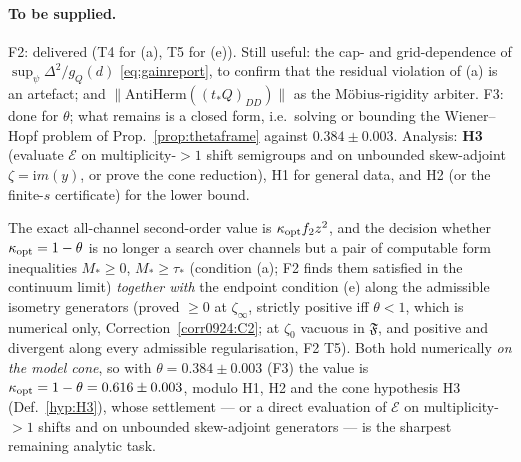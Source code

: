 \documentclass[11pt]{article}
\begin{document}
\paragraph{To be supplied.}
F2: delivered (T4 for (a), T5 for (e)).  Still useful: the cap- and grid-dependence
of $\sup_\psi\Delta^2/g_Q(d)$ \eqref{eq:gainreport}, to confirm that the residual violation
of (a) is an artefact; and $\|\mathrm{AntiHerm}((t_*Q)_{DD})\|$ as the M\"obius-rigidity
arbiter.  F3: done for $\theta$; what remains is a closed form, i.e.\ solving or bounding
the Wiener--Hopf problem of Prop.~\ref{prop:thetaframe} against $0.384\pm0.003$.  Analysis:
\textbf{H3} (evaluate $\mathcal E$ on multiplicity-$>1$ shift semigroups and on unbounded
skew-adjoint $\zeta=\mathrm im(y)$, or prove the cone reduction), H1 for general data, and
H2 (or the finite-$s$ certificate) for the lower bound.

\begin{verdictgap}
The exact all-channel second-order value is $\kappa_{\rm opt}f_2z^2$, and the decision
whether $\kappa_{\rm opt}=1-\theta$ is no longer a search over channels but a pair of
computable form inequalities $M_*\ge0$, $M_*\ge\tau_*$ (condition (a); F2 finds them
satisfied in the continuum limit) \emph{together with} the endpoint condition (e) along the
admissible isometry generators (proved $\ge0$ at $\zeta_\infty$, strictly positive iff $\theta<1$, which is numerical only, Correction~\ref{corr0924:C2}; at $\zeta_0$ vacuous in
$\mathfrak F$, and positive and divergent along every admissible regularisation, F2 T5).
Both hold numerically \emph{on the model cone}, so with
$\theta=0.384\pm0.003$ (F3) the value is $\kappa_{\rm opt}=1-\theta=0.616\pm0.003$, modulo
H1, H2 and the cone hypothesis H3 (Def.~\ref{hyp:H3}), whose settlement --- or a direct
evaluation of $\mathcal E$ on multiplicity-$>1$ shifts and on unbounded skew-adjoint
generators --- is the sharpest remaining analytic task.
\end{verdictgap}
\end{document}
